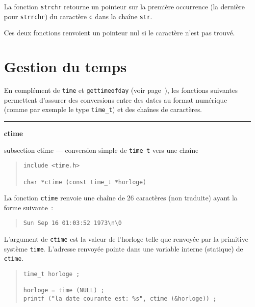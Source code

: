 \documentclass [twoside] {report}
\newcommand {\primitive} [1]
    {
	\phantomsection
	{\large \textbf {#1}}
	\addcontentsline {toc} {subsection} {#1}
    }
\newcommand {\separation}
    {
	\vspace {5mm}
	\nopagebreak
	\hrule
    }
\begin{document}
La fonction \texttt {strchr} retourne un pointeur sur la première
occurrence (la dernière pour \texttt {strrchr}) du caractère \texttt {c}
dans la chaîne \texttt {str}.

Ces deux fonctions renvoient un pointeur nul si le
caractère n'est pas trouvé.




\section {Gestion du temps}
    \label {gestion-temps}

En complément de \texttt {time} et \texttt {gettimeofday} (voir
page~\pageref {time}), les fonctions suivantes permettent d'assurer des
conversions entre des dates au format numérique (comme par exemple le
type \texttt {time\_t}) et des chaînes de caractères.


\separation 
\primitive {ctime} --- conversion simple de \texttt {time\_t} vers une chaîne

\begin {quote}
\begin {verbatim}
include <time.h>

char *ctime (const time_t *horloge)
\end{verbatim}
\end {quote}

La fonction \texttt {ctime} renvoie une chaîne de 26 caractères
(non traduite) ayant la forme suivante~:
\begin {quote}
\begin {verbatim}
Sun Sep 16 01:03:52 1973\n\0
\end{verbatim}
\end {quote}
L'argument de \texttt {ctime} est la valeur de l'horloge telle que
renvoyée par la primitive système \texttt {time}. L'adresse renvoyée
pointe dans une variable interne (statique) de \texttt{ctime}.

\begin {quote}
\begin{verbatim}
time_t horloge ;

horloge = time (NULL) ;
printf ("la date courante est: %s", ctime (&horloge)) ;
\end{verbatim}
\end {quote}
\end{document}
